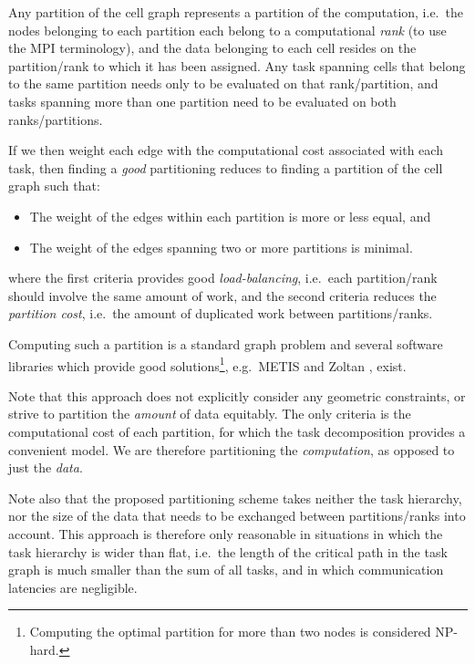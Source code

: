 \documentclass{sig-alternate-05-2015}
\begin{document}
Any partition of the cell graph represents a partition of the
computation, i.e.~the nodes belonging to each partition each belong
to a computational {\em rank} (to use the MPI terminology), and the
data belonging to each cell resides on the partition/rank to which
it has been assigned.
Any task spanning cells that belong to the same partition needs only
to be evaluated on that rank/partition, and tasks spanning more than
one partition need to be evaluated on both ranks/partitions.

If we then weight each edge with the computational cost associated with
each task, then finding a {\em good} partitioning reduces to finding a
partition of the cell graph such that:
\begin{itemize}
  \item The weight of the edges within each partition is more or less
    equal, and
  \item The weight of the edges spanning two or more partitions is
    minimal.
\end{itemize}
\noindent where the first criteria provides good {\em load-balancing},
i.e.~each partition/rank should involve the same amount of work, and
the second criteria reduces the {\em partition cost}, i.e.~the amount
of duplicated work between partitions/ranks.

Computing such a partition is a standard graph problem and several
software libraries which provide good solutions\footnote{Computing
the optimal partition for more than two nodes is considered NP-hard.},
e.g.~METIS \cite{ref:Karypis1998} and Zoltan \cite{devine2002zoltan},
exist.

Note that this approach does not explicitly consider any geometric
constraints, or strive to partition the {\em amount} of data equitably.
The only criteria is the computational cost of each partition, for
which the task decomposition provides a convenient model.
We are therefore partitioning the {\em computation}, as opposed
to just the {\em data}.

Note also that the proposed partitioning scheme takes neither the
task hierarchy, nor the size of the data that needs to be exchanged
between partitions/ranks into account.
This approach is therefore only reasonable in situations in which
the task hierarchy is wider than flat, i.e.~the length of the critical
path in the task graph is much smaller than the sum of all tasks,
and in which communication latencies are negligible.
\end{document}
